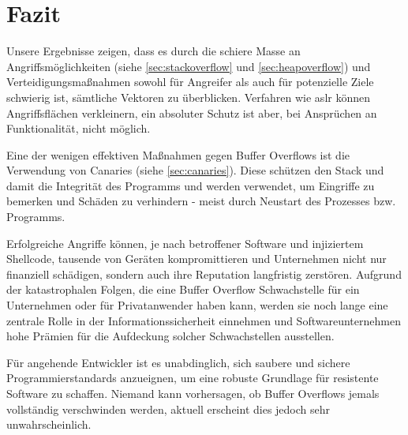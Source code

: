\pagebreak

\section{Fazit}
Unsere Ergebnisse zeigen, dass es durch die schiere Masse an Angriffsmöglichkeiten (siehe \autoref{sec:stackoverflow} und \ref*{sec:heapoverflow})
und Verteidigungsmaßnahmen sowohl für Angreifer als auch für potenzielle Ziele schwierig ist, sämtliche Vektoren zu überblicken. 
Verfahren wie \gls*{aslr} können Angriffsflächen verkleinern, ein absoluter Schutz ist aber, bei Ansprüchen an Funktionalität, nicht möglich.

Eine der wenigen effektiven Maßnahmen gegen Buffer Overflows ist die Verwendung von Canaries (siehe \autoref{sec:canaries}).
Diese schützen den Stack und damit die Integrität des Programms und werden verwendet, um Eingriffe zu bemerken und Schäden zu verhindern - meist durch Neustart
des Prozesses bzw. Programms.

Erfolgreiche Angriffe können, je nach betroffener Software und injiziertem Shellcode, tausende von Geräten kompromittieren und
Unternehmen nicht nur finanziell schädigen, sondern auch ihre Reputation langfristig zerstören. 
Aufgrund der katastrophalen Folgen, die eine Buffer Overflow Schwachstelle für ein Unternehmen oder für Privatanwender 
haben kann, werden sie noch lange eine zentrale Rolle in der Informationssicherheit einnehmen und 
Softwareunternehmen hohe Prämien für die Aufdeckung solcher Schwachstellen ausstellen. 

Für angehende Entwickler ist es unabdinglich, sich saubere und sichere Programmierstandards anzueignen, um eine robuste Grundlage für resistente Software zu schaffen. 
Niemand kann vorhersagen, ob Buffer Overflows jemals vollständig verschwinden werden, aktuell erscheint dies jedoch sehr unwahrscheinlich.




















